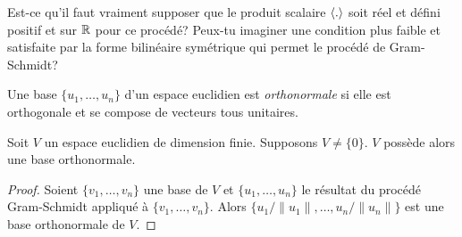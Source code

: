 \begin{exercise}
  \label{exe:6}
  Est-ce qu'il faut vraiment supposer que le produit scalaire
  $\langle {.} \rangle$
  soit réel et défini positif et sur $\mathbb{R}$ pour ce procédé? Peux-tu imaginer une condition plus
  faible et satisfaite par la forme bilinéaire symétrique  qui permet
  le procédé de Gram-Schmidt? 
\end{exercise}



\begin{definition}
  \label{def:7}
  Une base $\{u_1,\dots,u_n\}$
  d'un espace euclidien est \emph{orthonormale} si elle est
  orthogonale et se compose de vecteurs tous unitaires.
\end{definition}




\begin{corollary}
  \label{co:1}
  Soit $V$
  un espace euclidien de dimension finie. Supposons $V \neq
  \{0\}$. $V$ possède alors une base orthonormale.
\end{corollary}

\begin{proof}
  Soient $\{v_1,\dots,v_n\}$ une base de $V$ et $\{u_1,\dots,u_n\}$ le résultat du procédé Gram-Schmidt appliqué à $\{v_1,\dots,v_n\}$. Alors $\{u_1/ \|u_1\|,\dots,u_n/\|u_n\|\}$ est une base orthonormale de $V$. 
\end{proof}


